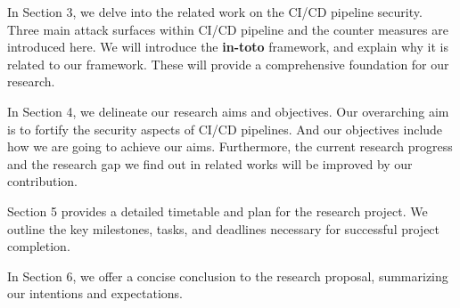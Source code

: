 In Section 3, we delve into the related work on the CI/CD pipeline security. Three main 
attack surfaces within CI/CD pipeline and the counter measures are introduced here. We will introduce the \textbf{in-toto}
framework, and explain why it is related to our framework. These will provide a comprehensive foundation for our research. 


In Section 4, we delineate our research aims and objectives. Our overarching aim is to fortify the security aspects of CI/CD pipelines. 
And our objectives include how we are going to achieve our aims. Furthermore, the current research 
progress and the research gap we find out in related works will be improved by our contribution.

Section 5 provides a detailed timetable and plan for the research project. 
We outline the key milestones, tasks, and deadlines necessary for successful project completion.

In Section 6, we offer a concise conclusion to the research proposal, summarizing our intentions and expectations.